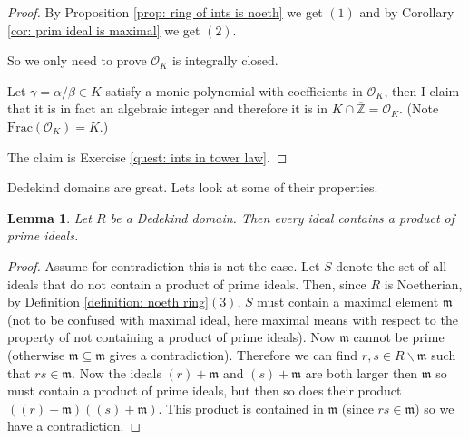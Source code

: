 \documentclass[11pt,a4paper]{report}
\theoremstyle{plain}
\newtheorem{lemma}[subsection]{Lemma}
\theoremstyle{definition}
\theoremstyle{definition}
\newcommand{\ZZ}{\mathbb{Z}}
\def\gothm{\mathfrak{m}}
\def \a{\alpha}
\def \g {\gamma}
\def \OO {\mathcal{O}}
\def \ov{\overline}
\begin{document}
	
	\begin{proof}
		
		By 	Proposition \ref{prop: ring of ints is noeth} we get $(1)$ and by Corollary \ref{cor: prim ideal is maximal} we get $(2)$.
		
		So we only need to prove $\OO_K$ is integrally closed. 
		
		Let $\gamma=\a / \beta \in K$ satisfy a monic polynomial with coefficients in $\OO_K$, then I claim that it is in fact an algebraic integer and therefore it is in $K \cap \ov{\ZZ}=\OO_K$. (Note $\mathrm{Frac}(\OO_K)=K$.) 
		
		The claim is Exercise \ref{quest: ints in tower law}.
		
		
		
		
		
		
		
		
	\end{proof}
	
	Dedekind domains are great. Lets look at some of their properties.
	
	
	\begin{lemma}\label{lem: ded dom ideal has prim ideals}
		Let $R$ be a Dedekind domain. Then every ideal contains a product of prime ideals.
	\end{lemma}
	
	\begin{proof}
		Assume for contradiction this is not the case. Let $S$ denote the set of all ideals that do not contain a product of prime ideals. Then, since $R$ is Noetherian, by Definition \ref{definition: noeth ring}$(3)$, $S$ must contain a maximal element $\gothm$ (not to be confused with maximal ideal, here maximal means with respect to the property of not containing a product of prime ideals). Now $\gothm$ cannot be prime (otherwise $\gothm \subseteq \gothm$ gives a contradiction). Therefore we can find $r,s \in R \backslash \gothm$ such that $rs \in \gothm$. Now the ideals $(r)+\gothm$ and $(s)+\gothm$ are both larger then $\gothm$ so must contain a product of prime ideals, but then so does their product $((r)+\gothm)((s)+\gothm)$. This product is contained in $\gothm$ (since $rs \in \gothm$) so we have a contradiction.
	\end{proof}
	
\end{document}

